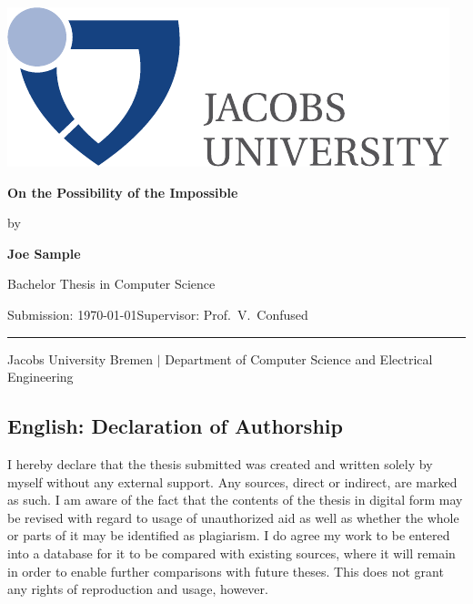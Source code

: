 \documentclass[a4paper,11pt,oneside]{article}
\newcommand{\myname}{Joe Sample}
\newcommand{\mytitle}{On the Possibility of the Impossible}
\newcommand{\mysupervisor}{Prof.~V.~Confused}
\begin{document}

    \thispagestyle{empty}

    \begin{flushright}
        \includegraphics[scale=0.8]{bsc-logo}
    \end{flushright}
    \vspace*{40mm}
    \begin{center}
        \huge
        \textbf{\mytitle}
    \end{center}
    \vspace*{4mm}
    \begin{center}
        \Large by
    \end{center}
    \vspace*{4mm}
    \begin{center}
        \LARGE
        \textbf{\myname}
    \end{center}
    \vspace*{20mm}
    \begin{center}
        \Large
        Bachelor Thesis in Computer Science
    \end{center}
    \vfill
    \begin{flushleft}
        \large
        Submission: \today \hfill Supervisor: \mysupervisor \\
        \rule{\textwidth}{1pt}
    \end{flushleft}
    \begin{center}
        Jacobs University Bremen $|$ Department of Computer Science and Electrical Engineering
    \end{center}

    \newpage
    \thispagestyle{empty}

    \subsection*{English: Declaration of Authorship}

    I hereby declare that the thesis submitted was created and written
    solely by myself without any external support. Any sources, direct
    or indirect, are marked as such. I am aware of the fact that the
    contents of the thesis in digital form may be revised with regard to
    usage of unauthorized aid as well as whether the whole or parts of
    it may be identified as plagiarism. I do agree my work to be entered
    into a database for it to be compared with existing sources, where
    it will remain in order to enable further comparisons with future
    theses. This does not grant any rights of reproduction and usage,
    however.
\end{document}
